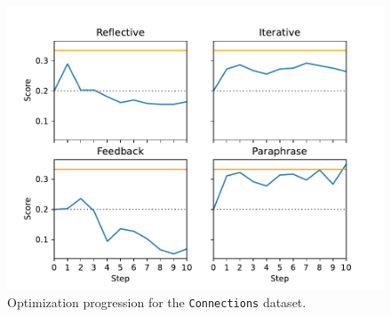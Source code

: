 \begin{table}[htbp]
\begin{tabular}{|c||c|c|c|c|}
    \end{tabular}
\end{table}

\begin{figure}
    \includegraphics[width=\linewidth]{connections.pdf}
    \caption{Optimization progression for the \texttt{Connections} dataset.}
    \label{fig:connections}
\end{figure}

